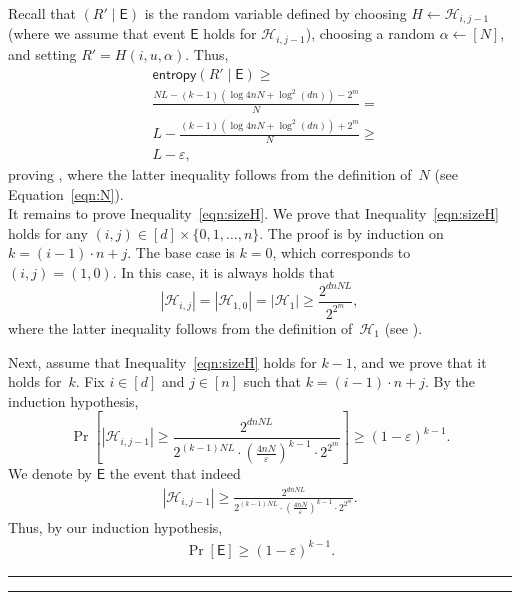 \documentclass[11pt]{article}
\theoremstyle{plain}
\theoremstyle{definition}
\numberwithin{equation}{section}
\newcommand{\qedsymb}{\hfill{\rule{2mm}{2mm}}}
\renewenvironment{proof}{\begin{trivlist} \item[\hspace{\labelsep}{\bf
\noindent Proof.\/}] }{\qedsymb\end{trivlist}}
\numberwithin{equation}{section} \newcommand{\aka} {also known as\ }
\newcommand{\abs}[1]{\left|#1\right|}
\newcommand{\Hc}{\mathcal H}
\def\epsilon{\varepsilon}
\newcommand{\1}{\mathbf{1}}
\newcommand{\ent}{\mathsf{entropy}}
\newcommand{\event}{\mathsf{E}}
\theoremstyle{remark}
\begin{document}
\begin{proof}
\begin{proof}
Recall that $(R'\mid\event)$ is the random variable defined by choosing $H\leftarrow\Hc_{i,j-1}$ (where we assume that event $\event$ holds for $\Hc_{i,j-1}$), choosing a random $\alpha\leftarrow[N]$, and setting $R'=H(i,u,\alpha)$.
Thus,
\begin{align*}
&\ent(R'\mid\event)\geq \\
&\frac{NL-(k-1)(\log {4nN}+\log^2(dn))-2^m}{N}=\\
&L-\frac{(k-1)(\log {4nN}+\log^2(dn))+2^m}{N}\geq \\
&L-\epsilon,
\end{align*}
proving , where the latter inequality follows from the definition of~$N$ (see Equation~\eqref{eqn:N}).\\


It remains to prove Inequality~\eqref{eqn:sizeH}.  We prove that Inequality~\eqref{eqn:sizeH} holds for any $(i,j)\in[d]\times\{0,1,\ldots,n\}$.  The proof is  by induction on $k=(i-1)\cdot n+j$.
The base case is $k=0$, which corresponds to $(i,j)=(1,0)$.
In this case, it is always holds that
$$
\abs{\Hc_{i,j}}=\abs{\Hc_{1,0}}=\abs{\Hc_1}\geq \frac{2^{dnN L}}{2^{2^m}},
$$
where the latter inequality follows from the definition of~$\Hc_1$ (see ).

Next, assume that Inequality~\eqref{eqn:sizeH} holds for $k-1$, and we prove that it holds for~$k$.
Fix $i\in[d]$ and $j\in[n]$ such that $k=(i-1)\cdot n+j$.
By the induction hypothesis,
 \begin{equation*}
    \Pr\left[\abs{\Hc_{i,j-1}}\geq\frac{2^{dnN L}}{2^{(k-1)NL}\cdot \left(\frac{4nN}{\epsilon}\right)^{k-1}\cdot 2^{2^m}}\right]\geq (1-\epsilon)^{k-1}.
  \end{equation*}
We denote by $\event$ the event that indeed
  \begin{align*}
    \abs{\Hc_{i,j-1}}\geq\frac{2^{dnN L}}{2^{(k-1)NL}\cdot \left(\frac{4nN}{\epsilon}\right)^{k-1}\cdot 2^{2^m}}.
  \end{align*}
  Thus, by our induction hypothesis,
  \begin{align*}
    \Pr[\event]\geq (1-\epsilon)^{k-1}.
  \end{align*}


\end{proof}
\end{proof}
\end{document}
